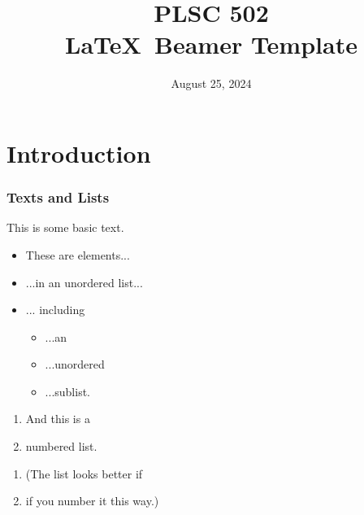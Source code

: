 \documentclass[10pt]{beamer}
\newcommand{\nin}{\noindent}
\newcommand{\be}{\begin{enumerate}}
\newcommand{\ee}{\end{enumerate}}
\newcommand{\bi}{\begin{itemize}}
\newcommand{\ei}{\end{itemize}}
\newcommand{\+}{\item}
\newcommand{\?}{\item[$\cdot$]}
\newcommand{\0}{\mathbf{0}}
\newcommand{\1}{\mathbf{1}}
\begin{document}

\title{\huge {\bf PLSC 502} \\ \LaTeX~Beamer Template}
\date{August 25, 2024}

\frame{\titlepage}  %


\section{Introduction}

\begin{frame}[fragile] \frametitle{Texts and Lists}

\nin This is some basic text.

\bi

\+ These are elements...

\+ ...in an unordered list...

\+ ... including
   \bi
   \? ...an
   \? ...unordered
   \? ...sublist. 
   \ei
\ei

\be
\+ And this is a 
\+ numbered list.
\ee

\be
\+[1.] (The list looks better if 
\+[2.] if you number it this way.)
\ee


\end{frame}
\end{document}
